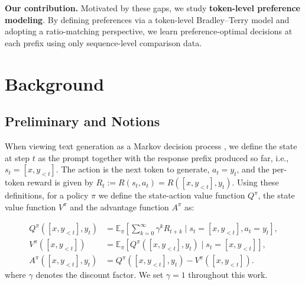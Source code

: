 \documentclass{article}
\theoremstyle{plain}
\theoremstyle{definition}
\theoremstyle{remark}
\begin{document}
\textbf{Our contribution.}
Motivated by these gaps, we study \textbf{token-level preference modeling}. 
By defining preferences via a token-level Bradley--Terry model and adopting a ratio-matching perspective, we learn preference-optimal decisions at each prefix using only sequence-level comparison data.

\section{Background}
\subsection{Preliminary and Notions}
When viewing text generation as a Markov decision process \citep{Puterman1994MDP}, we define the state at step $t$ as the prompt together with the response prefix produced so far, i.e., $s_t = [x, y_{<t}]$. The action is the next token to generate, $a_t = y_t$, and the per-token reward is given by $R_t := R(s_t, a_t) = R([x, y_{<t}], y_t)$.
Using these definitions, for a policy $\pi$ we define the state-action value function $Q^\pi$, the state value function $V^\pi$ and the advantage function $A^\pi$ as:

{\small
\begin{align*}
Q^\pi([x, y_{<t}], y_t) &= \mathbb{E}_\pi\left[\sum_{k=0}^\infty \gamma^k R_{t+k} \mid s_t = [x, y_{<t}], a_t = y_t\right], \nonumber \\
V^\pi([x, y_{<t}]) &= \mathbb{E}_\pi\left[Q^\pi([x, y_{<t}], y_t) \mid s_t = [x, y_{<t}]\right], \nonumber \\
A^\pi([x, y_{<t}], y_t) &= Q^\pi([x, y_{<t}], y_t) - V^\pi([x, y_{<t}]).
\end{align*}
}
where $\gamma$ denotes the discount factor. We set $\gamma = 1$ throughout this work.
\end{document}
